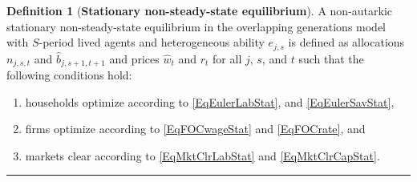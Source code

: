 \documentclass[letterpaper,12pt]{article}
\theoremstyle{definition}
\newtheorem{definition}{Definition} %
\begin{document}
    \begin{definition}[\textbf{Stationary non-steady-state equilibrium}]\label{DefEquilNonSS}
      A non-autarkic stationary non-steady-state equilibrium in the overlapping generations model with $S$-period lived agents and heterogeneous ability $e_{j,s}$ is defined as allocations $n_{j,s,t}$ and $\hat{b}_{j,s+1,t+1}$ and prices $\hat{w}_t$ and $r_t$ for all $j$, $s$, and $t$ such that the following conditions hold:
       \begin{enumerate}
          \item households optimize according to \eqref{EqEulerLabStat}, and \eqref{EqEulerSavStat},
          \item firms optimize according to \eqref{EqFOCwageStat} and \eqref{EqFOCrate}, and
          \item markets clear according to \eqref{EqMktClrLabStat} and \eqref{EqMktClrCapStat}.
       \end{enumerate}
    \end{definition}
    \hrule
\end{document}
